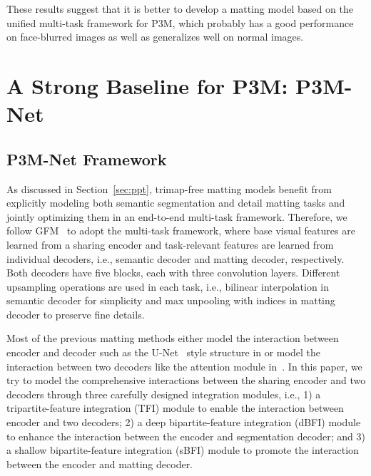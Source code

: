 \documentclass[twocolumn]{svjour3}
\begin{document}
These results suggest that it is better to develop a matting model based on the unified multi-task framework for P3M, which probably has a good performance on face-blurred images as well as generalizes well on normal images.

\label{sec:ppt}




\section{A Strong Baseline for P3M: P3M-Net}\label{sec:p3mnet}

\subsection{P3M-Net Framework}

As discussed in Section~\ref{sec:ppt}, trimap-free matting models benefit from explicitly modeling both semantic segmentation and detail matting tasks and jointly optimizing them in an end-to-end multi-task framework. Therefore, we follow GFM~\citep{gfm} to adopt the multi-task framework, where base visual features are learned from a sharing encoder and task-relevant features are learned from individual decoders, i.e., semantic decoder and matting decoder, respectively. Both decoders have five blocks, each with three convolution layers. Different upsampling operations are used in each task, i.e., bilinear interpolation in semantic decoder for simplicity and max unpooling with indices in matting decoder to preserve fine details.

Most of the previous matting methods either model the interaction between encoder and decoder such as the U-Net~\citep{unet} style structure in \citep{gfm} or model the interaction between two decoders like the attention module in~\citep{hatt}. In this paper, we try to model the comprehensive interactions between the sharing encoder and two decoders through three carefully designed integration modules, i.e., 1) a tripartite-feature integration (TFI) module to enable the interaction between encoder and two decoders; 2) a deep bipartite-feature integration (dBFI) module to enhance the interaction between the encoder and segmentation decoder; and 3) a shallow bipartite-feature integration (sBFI) module to promote the interaction between the encoder and matting decoder.
\end{document}
